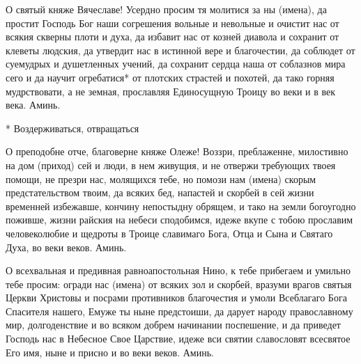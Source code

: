 \bigskip\bigskip\mychapterending

 


О святый княже Вячеславе! Усердно просим тя молитися за ны (имена), да простит Господь Бог наши согрешения вольные и невольные и очистит нас от всякия скверны плоти и духа, да избавит нас от козней диавола и сохранит от клеветы людския, да утвердит нас в истинной вере и благочестии, да соблюдет от суемудрых и душетленных учений, да сохранит сердца наша от соблазнов мира сего и да научит огребатися* от плотских страстей и похотей, да тако горняя мудрствовати, а не земная, прославляя Единосущную Троицу во веки и в век века. Аминь.


* Воздерживаться, отвращаться


\bigskip\bigskip\mychapterending

 


О преподобне отче, благоверне княже Олеже! Воззри, преблаженне, милостивно на дом (приход) сей и люди, в нем живущия, и не отвержи требующих твоея помощи, не презри нас, молящихся тебе, но помози нам (имена) скорым предстательством твоим, да всяких бед, напастей и скорбей в сей жизни временней избежавше, кончину непостыдну обрящем, и тако на земли богоугодно поживше, жизни райския на небеси сподобимся, идеже вкупе с тобою прославим человеколюбие и щедроты в Троице славимаго Бога, Отца и Сына и Святаго Духа, во веки веков. Аминь.


\bigskip\bigskip\mychapterending

 


О всехвальная и предивная равноапостольная Нино, к тебе прибегаем и умильно тебе просим: огради нас (имена) от всяких зол и скорбей, вразуми врагов святыя Церкви Христовы и посрами противников благочестия и умоли Всеблагаго Бога Спасителя нашего, Емуже ты ныне предстоиши, да дарует народу православному мир, долгоденствие и во всяком добрем начинании поспешение, и да приведет Господь нас в Небесное Свое Царствие, идеже  вси святии славословят всесвятое Его имя, ныне и присно и во веки веков. Аминь.


